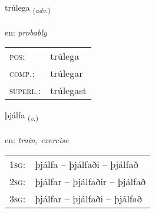 \documentclass[frontgrid, backgrid]{flacards}\usepackage[]{graphicx}\usepackage[]{xcolor}
\begin{document}
\renewcommand{\flhead}{\vskip5pt \fboxsep=0pt {\small\bfseries\footnotesize Atviksorð | Adverb}}
\renewcommand{\fcfoot}{\vskip5pt \fboxsep=0pt \hspace{2pt}{\small\bfseries\footnotesize 3K}}

\renewcommand{\blhead}{\vskip5pt {\small\bfseries\footnotesize Atviksorð | Adverb }}
\renewcommand{\bcfoot}{\vskip5pt \hspace{2pt}{\small\bfseries\footnotesize 3K}}


{trúlega \small{\textsubscript{(\textit{adv.})}} \\[1ex] %
\textphonetic{[tʰruːlɛɣa]} \\
en: \emph{probably} \\  [2ex]
\renewcommand*{\arraystretch}{0.8}
\begin{tabular}{ll}
\textsc{pos}: & trúlega \\ 
\textsc{comp.}: & trúlegar \\ 
\textsc{superl.}: & trúlegast \\
\end{tabular}
}

\renewcommand{\flhead}{\vskip5pt \fboxsep=0pt {\small\bfseries\footnotesize Sagnorð | Verb}}
\renewcommand{\fcfoot}{\vskip5pt \fboxsep=0pt \hspace{2pt}{\small\bfseries\footnotesize 3K}}

\renewcommand{\blhead}{\vskip5pt {\small\bfseries\footnotesize Sagnorð | Verb }}
\renewcommand{\bcfoot}{\vskip5pt \hspace{2pt}{\small\bfseries\footnotesize 3K}}


{þjálfa \small{\textsubscript{(\textit{v.})}} \\[1ex] %
\textphonetic{[θjaulva]} \\
en: \emph{train, exercise} \\  [2ex]
\renewcommand*{\arraystretch}{0.8}
\begin{tabular}{p{1cm}l}
\textsc{1sg}: & þjálfa -- þjálfaði -- þjálfað \\ 
\textsc{2sg}: & þjálfar -- þjálfaðir -- þjálfað \\ 
\textsc{3sg}: & þjálfar -- þjálfaði -- þjálfað \\ 
\end{tabular}
}
\end{document}
